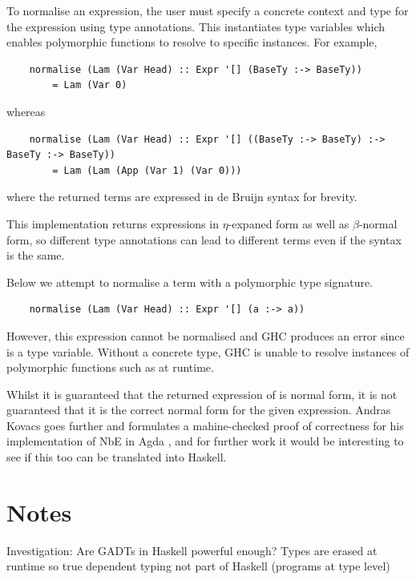 To normalise an expression, the user must specify a concrete context and type for the expression using type annotations. This instantiates type variables which enables polymorphic functions to resolve to specific instances. For example,

\begin{lstlisting}
    normalise (Lam (Var Head) :: Expr '[] (BaseTy :-> BaseTy)) 
        = Lam (Var 0)
\end{lstlisting}

whereas

\begin{lstlisting}
    normalise (Lam (Var Head) :: Expr '[] ((BaseTy :-> BaseTy) :-> BaseTy :-> BaseTy))
        = Lam (Lam (App (Var 1) (Var 0)))
\end{lstlisting}

where the returned terms are expressed in de Bruijn syntax for brevity.

This implementation returns expressions in $\eta$-expaned form as well as $\beta$-normal form, so different type annotations can lead to different terms even if the syntax is the same. 

Below we attempt to normalise a term with a polymorphic type signature.

\begin{lstlisting}
    normalise (Lam (Var Head) :: Expr '[] (a :-> a))
\end{lstlisting}

However, this expression cannot be normalised and GHC produces an error since  is a type variable. Without a concrete type, GHC is unable to resolve instances of polymorphic functions such as  at runtime.

Whilst it is guaranteed that the returned expression of  is normal form, it is not guaranteed that it is the correct normal form for the given expression. Andras Kovacs goes further and formulates a mahine-checked proof of correctness for his implementation of NbE in Agda \cite{AgdaNbe}, and for further work it would be interesting to see if this too can be translated into Haskell.


\section{Notes}

Investigation: Are GADTs in Haskell powerful enough? Types are erased at runtime so true dependent typing not part of Haskell (programs at type level)

